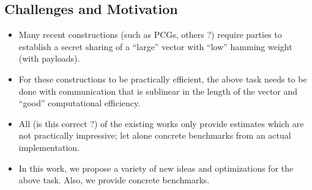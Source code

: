 

\subsection{Challenges and Motivation}

\begin{itemize}
  \item Many recent constructions (such as PCGs, others ?) require parties to establish a secret sharing of a ``large'' vector with ``low'' hamming weight (with payloads).

  \item  For these constructions to be practically efficient, the above task needs to be done with communication that is sublinear in the length of the vector and ``good'' computational efficiency.

  \item All (is this correct ?) of the existing works only provide estimates which are not practically impressive; let alone concrete benchmarks from an actual implementation.

  \item In this work, we propose a variety of new ideas and optimizations for the above task. Also, we provide concrete benchmarks.
\end{itemize}

